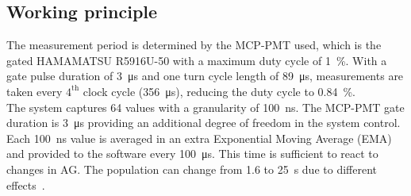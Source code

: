 \subsection{Working principle}
The measurement period is determined by the MCP-PMT used, which is the gated
HAMAMATSU R5916U-50 with a maximum duty cycle of \SI{1}{\%}. With a gate pulse duration
of \SI{3}{\micro\second} and one turn cycle length of \SI{89}{\micro\second},
measurements are taken every $4^{\text{th}}$ clock cycle (\SI{356}{\micro\second}),
reducing the duty cycle to \SI{0.84}{\%}.\\
The system captures 64 values with a granularity of \SI{100}{\nano\second}. The
MCP-PMT gate duration is \SI{3}{\micro\second} providing an additional degree of
freedom in the system control. Each \SI{100}{\nano\second} value is averaged in an
extra Exponential Moving Average (EMA) and provided to the software every \SI{100}{\micro\second}. This
time is sufficient to react to changes in AG. The population can change from
1.6 to \SI{25}{\second} due to different
effects~\cite{high_sensitivity_measurement}.

